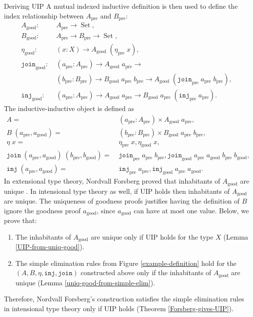 \documentclass[acmsmall,review]{acmart}\settopmatter{printfolios=true,printccs=false,printacmref=false}
\DeclareMathOperator{\USet}{Set}
\newcommand{\pre}[1]{{#1}_\text{pre}}
\newcommand{\good}[1]{{#1}_\text{good}}
\newcommand{\join}{\texttt{join}}
\newcommand{\inj}{\texttt{inj}}
\def\Forsberg/{Nordvall Forsberg}
\begin{document}
\begin{section}{Deriving UIP}
A mutual indexed inductive definition is then used to define the index relationship between $\pre{A}$ and $\pre{B}$:
\begin{align*}
\good{A}:&\; \pre{A}\to\USet,\\
\good{B}:&\; \pre{A}\to\pre{B}\to\USet,\\
\good{\eta}:&\; (x : X) \to \good{A}\;(\pre{\eta}\;x),\\
\good{\join}:&\; (\pre{a} : \pre{A})\to\good{A}\;\pre{a}\to\\&\;(\pre{b} : \pre{B})\to\good{B}\;\pre{a}\;\pre{b}\to\good{A}\;(\pre{\join}\;\pre{a}\;\pre{b}),\\
\good{\inj}:&\;(\pre{a}:\pre{A})\to\good{A}\;\pre{a}\to\good{B}\;\pre{a}\;(\pre{\inj}\;\pre{a}).
\end{align*}
The inductive-inductive object is defined as
\begin{align*}
A =&\; (\pre{a} : \pre{A})\times \good{A}\;\pre{a},\\
B\; (\pre{a},\good{a}) =&\; (\pre{b} : \pre{B})\times\good{B}\;\pre{a}\;\pre{b},\\
\eta\;x =&\;\pre{\eta}\;x,\good{\eta}\;x,\\
\join\;(\pre{a},\good{a})\;(\pre{b},\good{b})=&\; \pre{\join}\;\pre{a}\;\pre{b}, \good{\join}\;\pre{a}\;\good{a}\;\pre{b}\;\good{b},\\
\inj\;(\pre{a},\good{a})=&\;\pre{\inj}\;\pre{a}, \good{\inj}\;\pre{a}\;\good{a}.
\end{align*}
In extensional type theory, \Forsberg/ proved that inhabitants of $\good{A}$ are unique \citep[][Lemma 5.37(ii)]{nordvallforsberg2013thesis}. In intensional type theory as well, if UIP holds then inhabitants of $\good{A}$ are unique. The uniqueness of goodness proofs justifies having the definition of $B$ ignore the goodness proof $\good{a}$, since $\good{a}$ can have at most one value.
Below, we prove that:
\begin{enumerate}
    \item The inhabitants of $\good{A}$ are unique only if UIP holds for the type $X$ (Lemma \ref{UIP-from-uniq-good}).
    \item The simple elimination rules from Figure \ref{example-definition} hold for the $(A, B, \eta, \inj, \join)$ constructed above only if the inhabitants of $\good{A}$ are unique (Lemma \ref{uniq-good-from-simple-elim}).
\end{enumerate}
Therefore, \Forsberg/'s construction satisfies the simple elimination rules in intensional type theory only if UIP holds (Theorem \ref{Forsberg-gives-UIP}).


\end{section}
\end{document}
